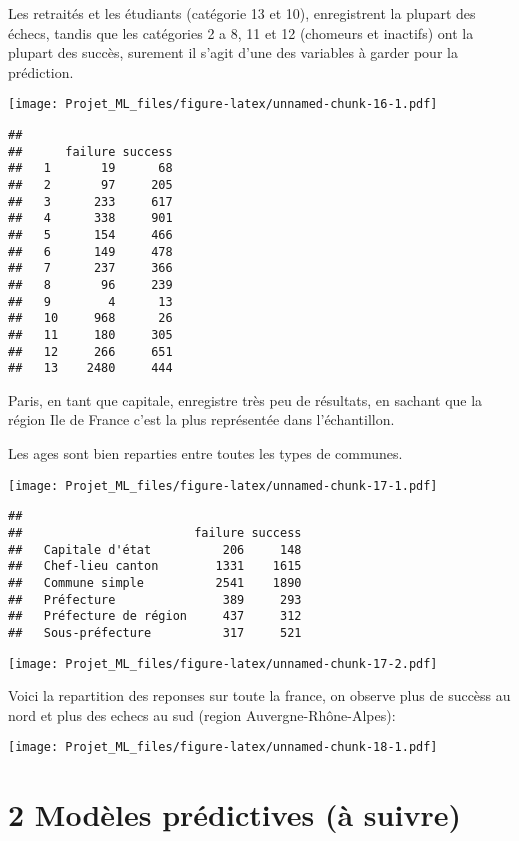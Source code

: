 \documentclass[]{article}
\begin{document}
Les retraités et les étudiants (catégorie 13 et 10), enregistrent la
plupart des échecs, tandis que les catégories 2 a 8, 11 et 12 (chomeurs
et inactifs) ont la plupart des succès, surement il s'agit d'une des
variables à garder pour la prédiction.

\texttt{[image: Projet\_ML\_files/figure-latex/unnamed-chunk-16-1.pdf]}

\begin{verbatim}
##     
##      failure success
##   1       19      68
##   2       97     205
##   3      233     617
##   4      338     901
##   5      154     466
##   6      149     478
##   7      237     366
##   8       96     239
##   9        4      13
##   10     968      26
##   11     180     305
##   12     266     651
##   13    2480     444
\end{verbatim}

Paris, en tant que capitale, enregistre très peu de résultats, en
sachant que la région Ile de France c'est la plus représentée dans
l'échantillon.

Les ages sont bien reparties entre toutes les types de communes.

\texttt{[image: Projet\_ML\_files/figure-latex/unnamed-chunk-17-1.pdf]}

\begin{verbatim}
##                       
##                        failure success
##   Capitale d'état          206     148
##   Chef-lieu canton        1331    1615
##   Commune simple          2541    1890
##   Préfecture               389     293
##   Préfecture de région     437     312
##   Sous-préfecture          317     521
\end{verbatim}

\texttt{[image: Projet\_ML\_files/figure-latex/unnamed-chunk-17-2.pdf]}

Voici la repartition des reponses sur toute la france, on observe plus
de succèss au nord et plus des echecs au sud (region
Auvergne-Rhône-Alpes):

\texttt{[image: Projet\_ML\_files/figure-latex/unnamed-chunk-18-1.pdf]}

\section{2 Modèles prédictives (à
suivre)}\label{modeles-predictives-a-suivre}
\end{document}
